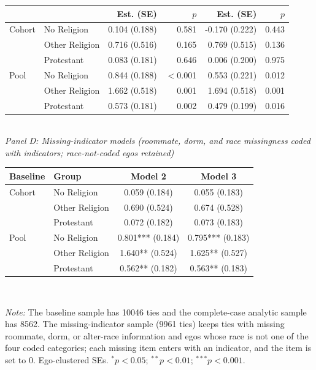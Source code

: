 \begin{table}[htbp]
\begin{tabular}{llrrrr}
 & & Est. (SE) & $p$ & Est. (SE) & $p$ \\
\midrule
Cohort & No Religion & 0.104 (0.188) & 0.581 & -0.170 (0.222) & 0.443 \\
 & Other Religion & 0.716 (0.516) & 0.165 & 0.769 (0.515) & 0.136 \\
 & Protestant & 0.083 (0.181) & 0.646 & 0.006 (0.200) & 0.975 \\
Pool & No Religion & 0.844 (0.188) & $<$0.001 & 0.553 (0.221) & 0.012 \\
 & Other Religion & 1.662 (0.518) & 0.001 & 1.694 (0.518) & 0.001 \\
 & Protestant & 0.573 (0.181) & 0.002 & 0.479 (0.199) & 0.016 \\
\bottomrule
\end{tabular}
\\[8pt]
\textit{Panel D: Missing-indicator models (roommate, dorm, and race missingness coded with indicators; race-not-coded egos retained)}\\[2pt]
\begin{tabular}{llcc}
\toprule
Baseline & Group & Model 2 & Model 3 \\
\midrule
Cohort & No Religion & 0.059 (0.184) & 0.055 (0.183) \\
 & Other Religion & 0.690 (0.524) & 0.674 (0.528) \\
 & Protestant & 0.072 (0.182) & 0.073 (0.183) \\
Pool & No Religion & 0.801*** (0.184) & 0.795*** (0.183) \\
 & Other Religion & 1.640** (0.524) & 1.625** (0.527) \\
 & Protestant & 0.562** (0.182) & 0.563** (0.183) \\
\bottomrule
\end{tabular}
\\[4pt]
\begin{minipage}{0.95\textwidth}\footnotesize \textit{Note:} The baseline sample has 10046 ties and the complete-case analytic sample has 8562. The missing-indicator sample (9961 ties) keeps ties with missing roommate, dorm, or alter-race information and egos whose race is not one of the four coded categories; each missing item enters with an indicator, and the item is set to 0. Ego-clustered SEs. $^{*}p<0.05$; $^{**}p<0.01$; $^{***}p<0.001$.\end{minipage}
\end{table}
